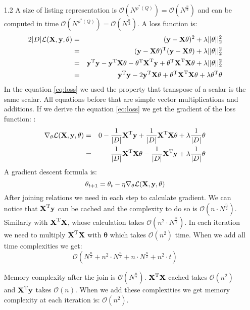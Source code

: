 \documentclass[10pt,a4paper]{article}
\begin{document}
\begin{enumerate}
\item[1.2]
A size of listing representation is $\mathcal{O}(N^{\rho^*(Q)})=\mathcal{O}(N^{\frac{n}{2}})$ and can be computed in time $\mathcal{O}(N^{\rho^*(Q)})=\mathcal{O}(N^{\frac{n}{2}})$.
A loss function is:
\begin{eqnarray}
2|D|\mathcal{L}(\textbf{\text{{X}}},\textbf{\text{{y}}}, \mathbf{\theta})  &=& (\textbf{\text{{y}}} - \textbf{\text{{X}}}\mathbf{\theta})^2 \nonumber + \lambda ||\mathbf{\theta}||_2^2\\
			&=& (\textbf{\text{{y}}} - \textbf{\text{{X}}}\mathbf{\theta}) ^ \text{T}(\textbf{\text{{y}}} - \textbf{\text{{X}}}\mathbf{\theta}) + \lambda ||\mathbf{\theta}||_2^2 \nonumber \\
&=&\textbf{\text{{y}}} ^ \text{T}\textbf{\text{{y}}} - \textbf{\text{{y}}} ^ \text{T}\textbf{\text{{X}}}\mathbf{\theta}
- \mathbf{\theta} ^ \text{T}\textbf{\text{{X}}} ^ \text{T} \textbf{\text{{y}}}
+ \mathbf{\theta} ^ \text{T}\textbf{\text{{X}}} ^ \text{T}\textbf{\text{{X}}}\mathbf{\theta} + \lambda ||\mathbf{\theta}||_2^2 \nonumber \\
&=&
\textbf{\text{{y}}} ^ \text{T}\textbf{\text{{y}}} - 2 \textbf{\text{{y}}} ^ \text{T}\textbf{\text{{X}}}\mathbf{\theta}
+ \mathbf{\theta} ^ \text{T}\textbf{\text{{X}}} ^ \text{T}\textbf{\text{{X}}}\mathbf{\theta} + \lambda\mathbf{\theta} ^ \text{T}\mathbf{\theta}
\label{eq:loss}
\end{eqnarray}
In the equation \ref{eq:loss} we used the property that transpose of a scalar is the same scalar. All equations before that are simple vector multiplications and additions. 
If we derive the equation \ref{eq:loss} we get the gradient of the loss function: :
\begin{eqnarray}
\nabla_{\mathbf{\theta}} \mathcal{L}(\textbf{\text{{X}}},\textbf{\text{{y}}}, \mathbf{\theta}) &=& 0  - \frac{1}{|D|}\textbf{\text{{X}}} ^ \text{T}\textbf{\text{{y}}} + \frac{1}{|D|}\textbf{\text{{X}}} ^ \text{T}\textbf{\text{{X}}}\mathbf{\theta} + \lambda \frac{1}{|D|}\mathbf{\theta} \nonumber \\
&=& \frac{1}{|D|}\textbf{\text{{X}}} ^ \text{T}\textbf{\text{{X}}}\mathbf{\theta} - \frac{1}{|D|}\textbf{\text{{X}}} ^ \text{T}\textbf{\text{{y}}} + \lambda\frac{1}{|D|}\mathbf{\theta}\nonumber
\end{eqnarray}
A gradient descent formula is:
$$\mathbf{\theta}_{t+1}=\mathbf{\theta}_t - \eta\nabla_{\mathbf{\theta}} \mathcal{L}(\textbf{\text{{X}}},\textbf{\text{{y}}}, \mathbf{\theta})$$
After joining relations we need in each step to calculate gradient. 
We can notice that $\textbf{\text{{X}}} ^ \text{T}\textbf{\text{{y}}}$ can be cached and the complexity to do so is $\mathcal{O}(n \cdot N^\frac{n}{2})$. Similarly with $\textbf{\text{{X}}} ^ \text{T}\textbf{\text{{X}}}$, whose calculation takes $\mathcal{O}(n^2 \cdot N^\frac{n}{2})$. In each iteration we need to multiply $\textbf{\text{{X}}} ^ \text{T}\textbf{\text{{X}}}$ with $\mathbf{\theta}$ which takes $\mathcal{O}(n^2)$ time.  
When we add  all time complexities we get:
$$\mathcal{O}(N^\frac{n}{2} + n^2 \cdot N^\frac{n}{2} + n \cdot  N^\frac{n}{2} + n^2 \cdot t) $$

Memory complexity after the join is
$\mathcal{O}(N^\frac{n}{2})$. $\textbf{\text{{X}}} ^ \text{T}\textbf{\text{{X}}}$ cached takes $\mathcal{O}(n^2)$ and $\textbf{\text{{X}}} ^ \text{T}\textbf{\text{{y}}}$ takes $\mathcal{O}(n)$.
When we add these complexities we get memory complexity at each iteration is:
$\mathcal{O}(n^2)$. 


\end{enumerate}
\end{document}
